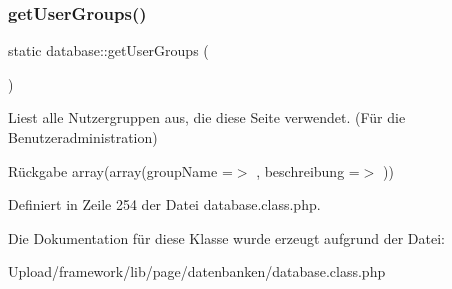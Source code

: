 \subsubsection{\texorpdfstring{get\+User\+Groups()}{getUserGroups()}}
{\footnotesize\ttfamily static database\+::get\+User\+Groups (\begin{DoxyParamCaption}{ }\end{DoxyParamCaption})\hspace{0.3cm}{\ttfamily [static]}}

Liest alle Nutzergruppen aus, die diese Seite verwendet. (Für die Benutzeradministration) \begin{DoxyReturn}{Rückgabe}
array(array(\textquotesingle{}group\+Name\textquotesingle{} =$>$ \textquotesingle{}\textquotesingle{}, \textquotesingle{}beschreibung\textquotesingle{} =$>$ \textquotesingle{}\textquotesingle{})) 
\end{DoxyReturn}


Definiert in Zeile 254 der Datei database.\+class.\+php.



Die Dokumentation für diese Klasse wurde erzeugt aufgrund der Datei\+:\begin{DoxyCompactItemize}
\item 
Upload/framework/lib/page/datenbanken/database.\+class.\+php\end{DoxyCompactItemize}
